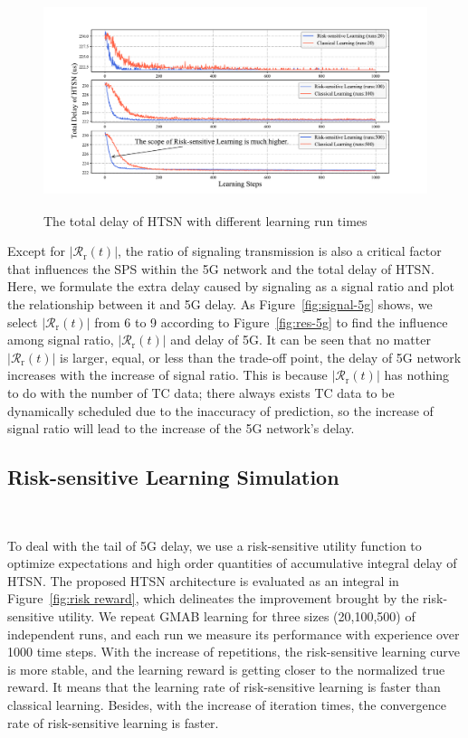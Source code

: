 \documentclass{SCIS2021}
\begin{document}
	\begin{figure}[t]
		\vspace{-0.2cm}
		\centering 
		\includegraphics[height=6.3cm, width=13cm]{risk_delay} 
		\caption{The total delay of HTSN with different learning run times} 
		\label{fig:risk_delay}
	\end{figure}
	
	\par Except for $\left|\mathcal{R}_\mathrm{r}(t)\right|$, the ratio of signaling transmission is also a critical factor that influences the SPS within the 5G network and the total delay of HTSN. Here, we formulate the extra delay caused by signaling as a signal ratio and plot the relationship between it and 5G delay. As Figure~\ref{fig:signal-5g} shows, we select $\left|\mathcal{R}_\mathrm{r}(t)\right|$ from 6 to 9 according to Figure~\ref{fig:res-5g} to find the influence among signal ratio, $\left|\mathcal{R}_\mathrm{r}(t)\right|$ and delay of 5G. It can be seen that no matter $\left|\mathcal{R}_\mathrm{r}(t)\right|$ is larger, equal, or less than the trade-off point, the delay of 5G network increases with the increase of signal ratio. This is because $\left|\mathcal{R}_\mathrm{r}(t)\right|$ has nothing to do with the number of TC data; there always exists TC data to be dynamically scheduled due to the inaccuracy of prediction, so the increase of signal ratio will lead to the increase of the 5G network's delay.
	
	
	\subsection{Risk-sensitive Learning Simulation}~{}
	\par To deal with the tail of 5G delay, we use a risk-sensitive utility function to optimize expectations and high order quantities of accumulative integral delay of HTSN. The proposed HTSN architecture is evaluated as an integral in Figure~\ref{fig:risk reward}, which delineates the improvement brought by the risk-sensitive utility. We repeat GMAB learning for three sizes (20,100,500) of independent runs, and each run we measure its performance with experience over 1000 time steps. With the increase of repetitions, the risk-sensitive learning curve is more stable, and the learning reward is getting closer to the normalized true reward. It means that the learning rate of risk-sensitive learning is faster than classical learning. Besides, with the increase of iteration times, the convergence rate of risk-sensitive learning is faster.
	
\end{document}

